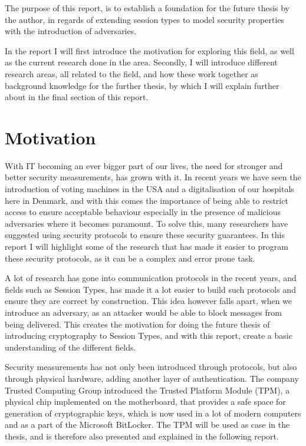 \label{chap:Introduction}
The purpose of this report, is to establish a foundation for the future thesis by the author, in regards of extending session types to model security properties with the introduction of adversaries.

In the report I will first introduce the motivation for exploring this field, as well as the current research done in the area. Secondly, I will introduce different research areas, all related to the field, and how these work together as background knowledge for the further thesis, by which I will explain further about in the final section of this report. 

\section{Motivation}
With IT becoming an ever bigger part of our lives, the need for stronger and better security measurements, has grown with it. In recent years we have seen the introduction of voting machines in the USA and a digitalisation of our hospitals here in Denmark, and with this comes the importance of being able to restrict access to ensure acceptable behaviour especially in the presence of malicious adversaries where it becomes paramount. To solve this, many researchers have suggested using security protocols to ensure these security guarantees. In this report I will highlight some of the research that has made it easier to program these security protocols, as it can be a complex and error prone task. 

A lot of research has gone into communication protocols in the recent years, and fields such as Session Types, has made it a lot easier to build such protocols and ensure they are correct by construction. This idea however falls apart, when we introduce an adversary, as an attacker would be able to block messages from being delivered. This creates the motivation for doing the future thesis of introducing cryptography to Session Types, and with this report, create a basic understanding of the different fields. 

Security measurements has not only been introduced through protocols, but also through physical hardware, adding another layer of authentication. The company Trusted Computing Group introduced the Trusted Platform Module (TPM), a physical chip implemented on the motherboard, that provides a safe space for generation of cryptographic keys, which is now used in a lot of modern computers and as a part of the Microsoft BitLocker. The TPM will be used as case in the thesis, and is therefore also presented and explained in the following report. 

